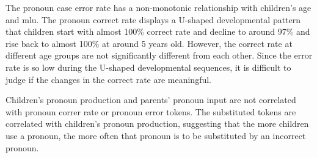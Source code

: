 The pronoun case error rate has a non-monotonic relationship with children's age and mlu. The pronoun correct rate displays a U-shaped developmental pattern that children start with almost 100\% correct rate and decline to around 97\% and rise back to almost 100\% at around 5 years old. However, the correct rate at different age groups are not significantly different from each other. Since the error rate is so low during the U-shaped developmental sequences, it is difficult to judge if the changes in the correct rate are meaningful. 

Children's pronoun production and parents' pronoun input are not correlated with pronoun correr rate or pronoun error tokens. The substituted tokens are correlated with children's pronoun production, suggesting that the more children use a pronoun, the more often that pronoun is to be substituted by an incorrect pronoun. 

